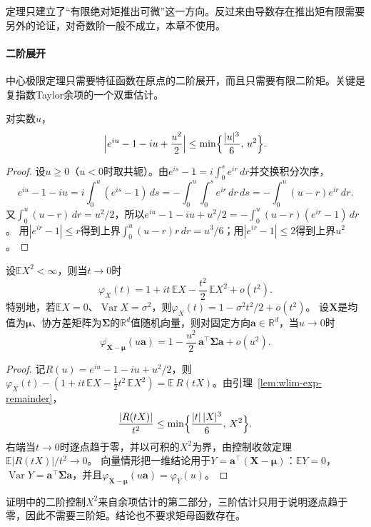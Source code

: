 定理只建立了“有限绝对矩推出可微”这一方向。反过来由导数存在推出矩有限需要另外的论证，对奇数阶一般不成立，本章不使用。

\paragraph{二阶展开}
中心极限定理只需要特征函数在原点的二阶展开，而且只需要有限二阶矩。关键是复指数Taylor余项的一个双重估计。

\begin{lemma}[复指数的二阶余项]
\label{lem:wlim-exp-remainder}
对实数$u$，
\[
  \Bigl|e^{iu}-1-iu+\frac{u^2}2\Bigr|\leq\min\Bigl\{\frac{|u|^3}6,\,u^2\Bigr\}.
\]
\end{lemma}

\begin{proof}
设$u\geq0$（$u<0$时取共轭）。由$e^{is}-1=i\int_0^se^{ir}\,dr$并交换积分次序，
\[
  e^{iu}-1-iu=i\int_0^u(e^{is}-1)\,ds=-\int_0^u\!\!\int_0^se^{ir}\,dr\,ds=-\int_0^u(u-r)e^{ir}\,dr.
\]
又$\int_0^u(u-r)\,dr=u^2/2$，所以$e^{iu}-1-iu+u^2/2=-\int_0^u(u-r)(e^{ir}-1)\,dr$。
用$|e^{ir}-1|\leq r$得到上界$\int_0^u(u-r)r\,dr=u^3/6$；用$|e^{ir}-1|\leq2$得到上界$u^2$。
\end{proof}

\begin{theorem}[有限二阶矩下的展开]
\label{thm:wlim-chf-second-order}
设$\mathbb E X^2<\infty$，则当$t\to0$时
\[
  \varphi_X(t)=1+it\,\mathbb E X-\frac{t^2}2\,\mathbb E X^2+o(t^2).
\]
特别地，若$\mathbb E X=0$、$\operatorname{Var}X=\sigma^2$，则$\varphi_X(t)=1-\sigma^2t^2/2+o(t^2)$。
设$\bm X$是均值为$\bm\mu$、协方差矩阵为$\bm\Sigma$的$\mathbb R^d$值随机向量，则对固定方向$\bm a\in\mathbb R^d$，当$u\to0$时
\[
  \varphi_{\bm X-\bm\mu}(u\bm a)=1-\frac{u^2}2\,\bm a^\top\bm\Sigma\bm a+o(u^2).
\]
\end{theorem}

\begin{proof}
记$R(u)=e^{iu}-1-iu+u^2/2$，则$\varphi_X(t)-(1+it\,\mathbb E X-\tfrac12t^2\,\mathbb E X^2)=\mathbb E\,R(tX)$。由引理~\ref{lem:wlim-exp-remainder}，
\[
  \frac{|R(tX)|}{t^2}\leq\min\Bigl\{\frac{|t|\,|X|^3}6,\,X^2\Bigr\}.
\]
右端当$t\to0$时逐点趋于零，并以可积的$X^2$为界，由控制收敛定理$\mathbb E|R(tX)|/t^2\to0$。
向量情形把一维结论用于$Y=\bm a^\top(\bm X-\bm\mu)$：$\mathbb E Y=0$，$\operatorname{Var}Y=\bm a^\top\bm\Sigma\bm a$，并且$\varphi_{\bm X-\bm\mu}(u\bm a)=\varphi_Y(u)$。
\end{proof}

证明中的二阶控制$X^2$来自余项估计的第二部分，三阶估计只用于说明逐点趋于零，因此不需要三阶矩。结论也不要求矩母函数存在。

